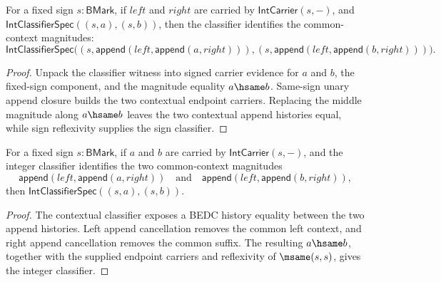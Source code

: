 \begin{theorem}
\label{thm:int-classifier-append-context-same-sign}
For a fixed sign $s:\mathsf{BMark}$, if $left$ and $right$ are carried
by $\mathsf{IntCarrier}(s,-)$, and
$\mathsf{IntClassifierSpec}((s,a),(s,b))$, then the classifier identifies
the common-context magnitudes:
$$
\mathsf{IntClassifierSpec}
\bigl((s,\mathsf{append}(left,\mathsf{append}(a,right))),
(s,\mathsf{append}(left,\mathsf{append}(b,right)))\bigr).
$$
\end{theorem}
\begin{proof}
Unpack the classifier witness into signed carrier evidence for $a$ and
$b$, the fixed-sign component, and the magnitude equality $a\hsame b$.
Same-sign unary append closure builds the two contextual endpoint carriers.
Replacing the middle magnitude along $a\hsame b$ leaves the two contextual
append histories equal, while sign reflexivity supplies the sign classifier.
\end{proof}

\begin{theorem}
\label{thm:int-classifier-cancel-append-context-same-sign}
For a fixed sign $s:\mathsf{BMark}$, if $a$ and $b$ are carried by
$\mathsf{IntCarrier}(s,-)$, and the integer classifier identifies
the two common-context magnitudes
$$
\mathsf{append}(left,\mathsf{append}(a,right))
\quad\text{and}\quad
\mathsf{append}(left,\mathsf{append}(b,right)),
$$
then $\mathsf{IntClassifierSpec}((s,a),(s,b))$.
\end{theorem}
\begin{proof}
The contextual classifier exposes a BEDC history equality between the two
append histories. Left append cancellation removes the common left context, and
right append cancellation removes the common suffix. The resulting
$a\hsame b$, together with the supplied endpoint carriers and reflexivity of
$\msame(s,s)$, gives the integer classifier.
\end{proof}

